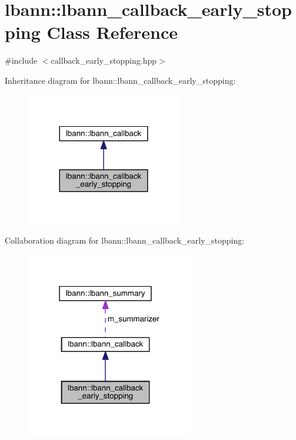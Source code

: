 \hypertarget{classlbann_1_1lbann__callback__early__stopping}{}\section{lbann\+:\+:lbann\+\_\+callback\+\_\+early\+\_\+stopping Class Reference}
\label{classlbann_1_1lbann__callback__early__stopping}


{\ttfamily \#include $<$callback\+\_\+early\+\_\+stopping.\+hpp$>$}



Inheritance diagram for lbann\+:\+:lbann\+\_\+callback\+\_\+early\+\_\+stopping\+:\nopagebreak
\begin{figure}[H]
\begin{center}
\leavevmode
\includegraphics[width=192pt]{classlbann_1_1lbann__callback__early__stopping__inherit__graph}
\end{center}
\end{figure}


Collaboration diagram for lbann\+:\+:lbann\+\_\+callback\+\_\+early\+\_\+stopping\+:\nopagebreak
\begin{figure}[H]
\begin{center}
\leavevmode
\includegraphics[width=207pt]{classlbann_1_1lbann__callback__early__stopping__coll__graph}
\end{center}
\end{figure}

